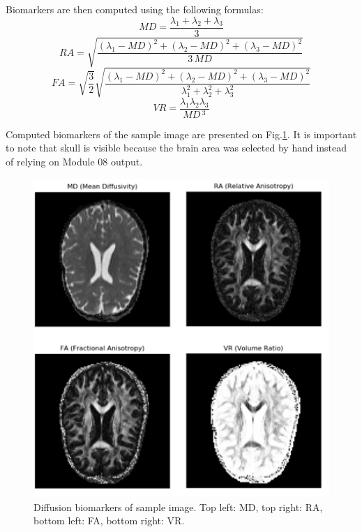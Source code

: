 Biomarkers are then computed using the following formulas:
\begin{equation}
MD = \dfrac{\lambda_{1}+\lambda_{2}+\lambda_{3}}{3}
\end{equation}
\begin{equation}
RA = \sqrt{\dfrac{\left(\lambda_{1}-MD\right)^2+\left(\lambda_{2}-MD\right)^2+\left(\lambda_{3}-MD\right)^2}{3\,MD}}
\end{equation}
\begin{equation}
FA = \sqrt{\dfrac{3}{2}}\sqrt{\dfrac{\left(\lambda_{1}-MD\right)^2+\left(\lambda_{2}-MD\right)^2+\left(\lambda_{3}-MD\right)^2}{\lambda_{1}^2+\lambda_{2}^2+\lambda_{3}^2}}
\end{equation}
\begin{equation}
VR = \frac{\lambda_{1}\lambda_{2}\lambda_{3}}{MD\,^3}
\end{equation}

Computed biomarkers of the sample image are presented on Fig.\ref{fig:m6_pic_4}. It is important to note that skull is visible because the brain area was selected by hand instead of relying on Module 08 output.

\begin{figure}[H]
	\includegraphics[width=12cm]{figures/Module_06/biomarkers_wls}
	\centering
	\caption{Diffusion biomarkers of sample image. Top left: MD, top right: RA, bottom left: FA, bottom right: VR.}
	\label{fig:m6_pic_4}
\end{figure}

